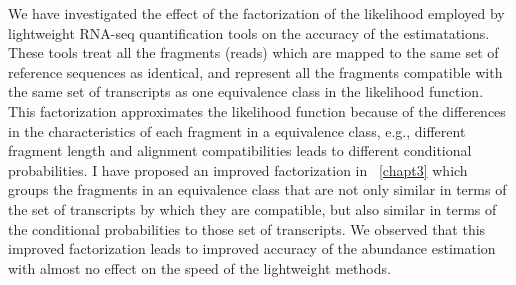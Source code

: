 We have investigated the effect of the factorization of the likelihood employed
by lightweight RNA-seq quantification tools on the accuracy of the estimatations. These tools
treat all the fragments (reads) which are mapped to the same set of reference sequences as identical,
and represent all the fragments compatible with the same set of transcripts as one equivalence
class in the likelihood function. 
This factorization approximates the likelihood function because of the differences in the 
characteristics of each fragment in a equivalence class, e.g., different fragment length
and alignment compatibilities leads to different conditional probabilities.
I have proposed an improved factorization in ~\cref{chapt3} which groups the fragments
in an equivalence class that are not only similar in terms of the set of transcripts by which
they are compatible, but also similar in terms of the conditional probabilities to those
set of transcripts. We observed that this improved factorization leads to improved accuracy of 
the abundance estimation with almost no effect on the speed of the lightweight methods.



